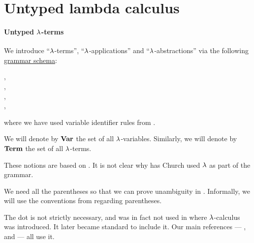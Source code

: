 \section{Untyped lambda calculus}\label{sec:untyped_lambda_calculus}

\paragraph{Untyped \( \synlambda \)-terms}

\begin{definition}\label{def:lambda_term}\mimprovised
  We introduce \enquote{\( \synlambda \)-terms}, \enquote{\( \synlambda \)-applications} and \enquote{\( \synlambda \)-abstractions} via the following \hyperref[def:formal_grammar/schema]{grammar schema}:
  \begin{bnf*}
        {}, \\
     {\bnftsq{\( ( \)} \bnfsp {} \bnfsp {} \bnfsp \bnftsq{\( ) \)}}, \\
     {\bnftsq{\( ( \)} \bnfsp \bnftsq{\( \synlambda \)} \bnfsp {} \bnfsp {} \bnfsp {} \bnfsp \bnftsq{\( ) \)}}, \\
            { \bnfor {} \bnfor {}},
  \end{bnf*}
  where we have used variable identifier rules from .

  \begin{thmenum}
     We will denote by \( \op*{Var} \) the set of all \( \synlambda \)-variables.
     Similarly, we will denote by \( \op*{Term} \) the set of all \( \synlambda \)-terms.
  \end{thmenum}
\end{definition}
\begin{comments}
  \item These notions are based on \cite[352]{Church1932Untyped}. It is not clear why has Church used \( \synlambda \) as part of the grammar.

  \item We need all the parentheses so that we can prove unambiguity in . Informally, we will use the conventions from  regarding parentheses.

  \item The dot is not strictly necessary, and was in fact not used in  where \( \synlambda \)-calculus was introduced. It later became standard to include it. Our main references --- ,  and  --- all use it.
\end{comments}

